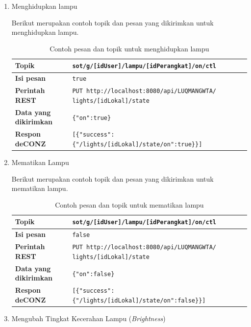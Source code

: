 \begin{enumerate}
	\item Menghidupkan lampu
	
	Berikut merupakan contoh topik dan pesan yang dikirimkan untuk menghidupkan lampu.
	
	\begin{table}
		\centering
		\caption{Contoh pesan dan topik untuk menghidupkan lampu}
		\label{tab:nyalainLampu}
		\begin{tabular}{|l |p{11cm} |}
			\hline
			\textbf{Topik} & \texttt{sot/g/[idUser]/lampu/[idPerangkat]/on/ctl} \\
			\hline
			\textbf{Isi pesan} & \texttt{true} \\
			\hline
			\textbf{Perintah REST }& \texttt{PUT http://localhost:8080/api/LUQMANGWTA/ lights/[idLokal]/state}\\
			\hline
			\textbf{Data yang dikirimkan} & \texttt{\{"on":true\}} \\
			\hline
			\textbf{Respon deCONZ} & \texttt{[\{"success":\{"/lights/[idLokal]/state/on":true\}\}]} \\
			\hline
		\end{tabular}
	\end{table}
	
	
	\item Mematikan Lampu
	
	Berikut merupakan contoh topik dan pesan yang dikirimkan untuk mematikan lampu.
	
	\begin{table}
		\centering
		\caption{Contoh pesan dan topik untuk mematikan lampu}
		\label{tab:matiinLampu}
		\begin{tabular}{| l | p{11cm} |}
			\hline
			\textbf{Topik} & \texttt{sot/g/[idUser]/lampu/[idPerangkat]/on/ctl} \\
			\hline
			\textbf{Isi pesan} & \texttt{false} \\
			\hline
			\textbf{Perintah REST} & \texttt{PUT http://localhost:8080/api/LUQMANGWTA/ lights/[idLokal]/state} \\
			\hline
			\textbf{Data yang dikirimkan} & \texttt{\{"on":false\}} \\
			\hline
			\textbf{Respon deCONZ} & \texttt{[\{"success":\{"/lights/[idLokal]/state/on":false\}\}]} \\
			\hline
		\end{tabular}
	\end{table}
	
	\item Mengubah Tingkat Kecerahan Lampu (\textit{Brightness})
	

\end{enumerate}

